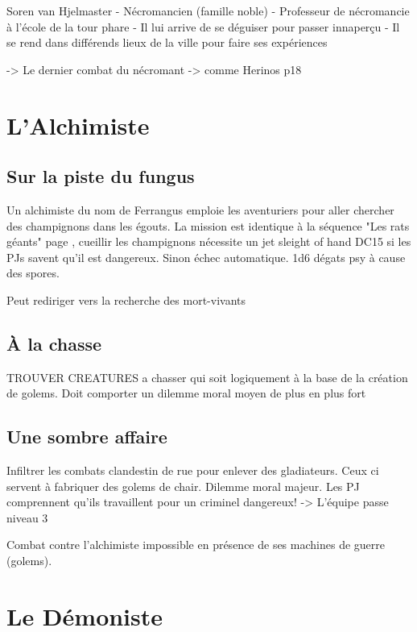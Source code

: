 Soren van Hjelmaster
 - Nécromancien (famille noble)
 - Professeur de nécromancie à l'école de la tour phare
 - Il lui arrive de se déguiser pour passer innaperçu
 - Il se rend dans différends lieux de la ville pour faire ses expériences

 -> Le dernier combat du nécromant -> comme Herinos p18

\section{L'Alchimiste}

\subsection{Sur la piste du fungus}

Un alchimiste du nom de Ferrangus emploie les aventuriers pour aller chercher des champignons dans les
égouts. La mission est identique à la séquence "Les rats géants" page \pageref{ss:RatsGeants}, cueillir 
les champignons nécessite un jet sleight of hand DC15
si les PJs savent qu'il est dangereux. Sinon échec automatique. 1d6 dégats psy à cause des spores.

Peut rediriger vers la recherche des mort-vivants 

\subsection{À la chasse}

TROUVER CREATURES a chasser qui soit logiquement à la base de la création de golems. Doit comporter
un dilemme moral moyen de plus en plus fort

\subsection{Une sombre affaire}

Infiltrer les combats clandestin de rue pour enlever des gladiateurs. Ceux ci servent à fabriquer
des golems de chair. Dilemme moral majeur. Les PJ comprennent qu'ils travaillent pour un criminel
dangereux!
 -> L'équipe passe niveau 3

Combat contre l'alchimiste impossible en présence de ses machines de guerre (golems).

\section{Le Démoniste}
\label{Demoniste}

